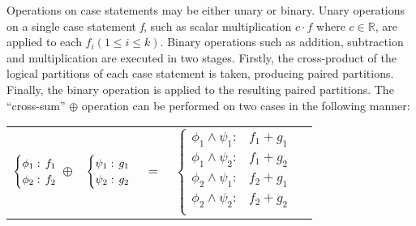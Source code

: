 Operations on case statements may be either unary or binary. 
Unary operations on a single case statement \emph{f}, such as scalar multiplication {\footnotesize$c \cdot f$} where {\footnotesize$ c \in \mathbb{R} $}, are applied to  each {\footnotesize$f_i \left(1 \leq i \leq k\right)$}. Binary operations such as addition, subtraction and multiplication are executed in two stages. Firstly, the cross-product of the logical partitions of each case statement is taken, producing paired partitions. Finally, the binary operation is applied to the resulting paired partitions. The ``cross-sum'' {\footnotesize$\oplus$} operation can be performed on two cases in the following manner:
{\footnotesize 
    \begin{center}
        \begin{tabular}{r c c c l}
            $\begin{cases}
            \phi_1: \hspace{-1mm} & \hspace{-1mm} f_1  \\ 
            \phi_2: \hspace{-1mm} & \hspace{-1mm} f_2  \\ 
            \end{cases}$
            $\oplus$
            &
            \hspace{-4mm}
            $\begin{cases}
            \psi_1: \hspace{-1mm} & \hspace{-1mm} g_1  \\ 
            \psi_2: \hspace{-1mm} & \hspace{-1mm} g_2  \\ 
            \end{cases}$
            &
            \hspace{-4mm} 
            $ = $
            &
            \hspace{-4mm}
            $\begin{cases}
            \phi_1 \wedge \psi_1: & f_1 + g_1 \\
            \phi_1 \wedge \psi_2: & f_1 + g_2 \\
            \phi_2 \wedge \psi_1: & f_2 + g_1 \\
            \phi_2 \wedge \psi_2: & f_2 + g_2  \\
            \end{cases}$
        \end{tabular}
    \end{center}
}%

